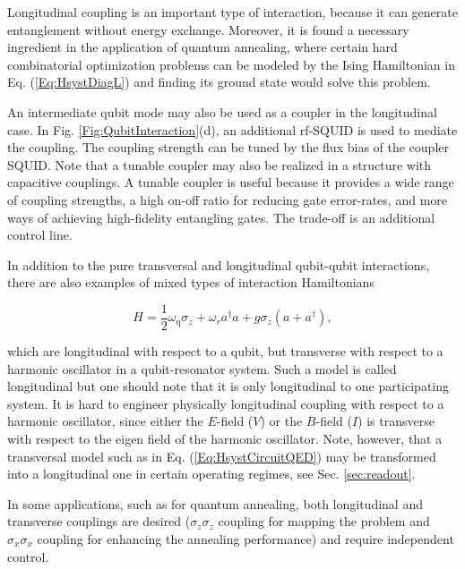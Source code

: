 \documentclass[aip,apr,twocolumn,showpacs,superscriptaddress,groupedaddress,nofootinbib,reprint]{revtex4-1}  %
\newcommand{\freq}{\omega_\text{q}}
\begin{document}
Longitudinal coupling is an important type of interaction, because it can generate entanglement without energy exchange. Moreover, it is found a necessary ingredient in the application of quantum annealing, where certain hard combinatorial optimization problems can be modeled by the Ising Hamiltonian in Eq. (\ref{Eq:HsystDiagL}) and finding its ground state would solve this problem.

An intermediate qubit mode may also be used as a coupler in the longitudinal case. In Fig. \ref{Fig:QubitInteraction}(d), an additional rf-SQUID is used to mediate the coupling. The coupling strength can be tuned by the flux bias of the coupler SQUID\cite{Kounalakis2018}. Note that a tunable coupler may also be realized in a structure with capacitive couplings\cite{McKay2016}. A tunable coupler is useful because it provides a wide range of coupling strengths\cite{Weber2017}, a high on-off ratio\cite{Chen2014} for reducing gate error-rates, and more ways of achieving high-fidelity entangling gates\cite{Roth2017,Didier2018a,Reagor2018,Yan2018}. The trade-off is an additional control line.

In addition to the pure transversal and longitudinal qubit-qubit interactions, there are also examples of mixed types of interaction Hamiltonians\cite{Didier2015}

\begin{equation}
H = \frac{1}{2}\freq \sigma_{z} + \omega_{r}a^{\dagger}a + g \sigma_{z}(a + a^{\dagger}),
\label{Eq:HsystDiagLC}
\end{equation}

\noindent which are longitudinal with respect to a qubit, but transverse with respect to a harmonic oscillator in a qubit-resonator system. Such a model is called longitudinal but one should note that it is only longitudinal to one participating system. It is hard to engineer physically longitudinal coupling with respect to a harmonic oscillator, since either the $E$-field ($V$) or the $B$-field ($I$) is transverse with respect to the eigen field of the harmonic oscillator. Note, however, that a transversal model such as in Eq. (\ref{Eq:HsystCircuitQED}) may be transformed into a longitudinal one in certain operating regimes, see Sec. \ref{sec:readout}.

In some applications, such as for quantum annealing, both longitudinal and transverse couplings are desired ($\sigma_z \sigma_z$ coupling for mapping the problem and $\sigma_x \sigma_x$ coupling for enhancing the annealing performance) and require independent control.
\end{document}
